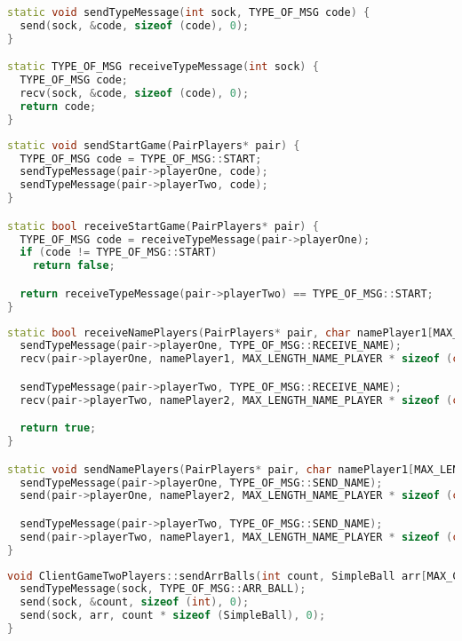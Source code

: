 \begin{lstlisting}[language=C++, caption={Отправка/прием типа сообщения},label=DescriptiveLabel]
static void sendTypeMessage(int sock, TYPE_OF_MSG code) {
  send(sock, &code, sizeof (code), 0);
}

static TYPE_OF_MSG receiveTypeMessage(int sock) {
  TYPE_OF_MSG code;
  recv(sock, &code, sizeof (code), 0);
  return code;
}
\end{lstlisting}

\begin{lstlisting}[language=C++, caption={Отправка/прием сообщения о старте игры},label=DescriptiveLabel]
static void sendStartGame(PairPlayers* pair) {
  TYPE_OF_MSG code = TYPE_OF_MSG::START;
  sendTypeMessage(pair->playerOne, code);
  sendTypeMessage(pair->playerTwo, code);
}

static bool receiveStartGame(PairPlayers* pair) {
  TYPE_OF_MSG code = receiveTypeMessage(pair->playerOne);
  if (code != TYPE_OF_MSG::START)
    return false;

  return receiveTypeMessage(pair->playerTwo) == TYPE_OF_MSG::START;
}

\end{lstlisting}

\begin{lstlisting}[language=C++, caption={Отправка/прием сообщения с именем},label=DescriptiveLabel]
static bool receiveNamePlayers(PairPlayers* pair, char namePlayer1[MAX_LENGTH_NAME_PLAYER], char namePlayer2[MAX_LENGTH_NAME_PLAYER]) {
  sendTypeMessage(pair->playerOne, TYPE_OF_MSG::RECEIVE_NAME);
  recv(pair->playerOne, namePlayer1, MAX_LENGTH_NAME_PLAYER * sizeof (char), 0);

  sendTypeMessage(pair->playerTwo, TYPE_OF_MSG::RECEIVE_NAME);
  recv(pair->playerTwo, namePlayer2, MAX_LENGTH_NAME_PLAYER * sizeof (char), 0);

  return true;
}

static void sendNamePlayers(PairPlayers* pair, char namePlayer1[MAX_LENGTH_NAME_PLAYER], char namePlayer2[MAX_LENGTH_NAME_PLAYER]) {
  sendTypeMessage(pair->playerOne, TYPE_OF_MSG::SEND_NAME);
  send(pair->playerOne, namePlayer2, MAX_LENGTH_NAME_PLAYER * sizeof (char), 0);

  sendTypeMessage(pair->playerTwo, TYPE_OF_MSG::SEND_NAME);
  send(pair->playerTwo, namePlayer1, MAX_LENGTH_NAME_PLAYER * sizeof (char), 0);
}
\end{lstlisting}

\begin{lstlisting}[language=C++, caption={Отправка массива шаров},label=DescriptiveLabel]
void ClientGameTwoPlayers::sendArrBalls(int count, SimpleBall arr[MAX_COUNT_BALLS]) {
  sendTypeMessage(sock, TYPE_OF_MSG::ARR_BALL);
  send(sock, &count, sizeof (int), 0);
  send(sock, arr, count * sizeof (SimpleBall), 0);
}
\end{lstlisting}

